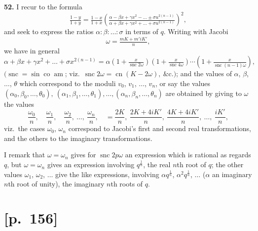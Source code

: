\documentclass[11pt]{article}
\begin{document}
\noindent\textbf{52.} I recur to the formula
\[
\tfrac{1-y}{1+y}=\tfrac{1-x}{1+x}\!\left(\tfrac{\alpha-\beta x+\gamma x^2-\ldots\pm\sigma u^{2(n-1)}}{\alpha+\beta x+\gamma x^2+\ldots+\sigma u^{2(n-1)}}\right)^{\!2}\!,
\]
and seek to express the ratios $\alpha:\beta:\ldots:\sigma$ in terms of $q$. Writing with Jacobi
\[
\omega=\tfrac{mK+m'iK'}{n},
\]
we have in general
\[
\alpha+\beta x+\gamma x^2+\ldots+\sigma x^{2(n-1)}=\alpha\!\left(1+\tfrac{x}{\operatorname{snc}2\omega}\right)\!\!\left(1+\tfrac{x}{\operatorname{snc}4\omega}\right)\!\cdots\!\left(1+\tfrac{x}{\operatorname{snc}(n-1)\omega}\right)\!,
\]
$(\operatorname{snc}=\operatorname{sin}\operatorname{co}\operatorname{am}$; viz.\ $\operatorname{snc}2\omega=\operatorname{cn}(K-2\omega),\ \&\text{c.})$;
and the values of $\alpha$, $\beta$, $\ldots$, $\theta$ which correspond to the moduli $v_0$, $v_1$, $\ldots$, $v_n$, or say the
values $(\alpha_0,\beta_0,\ldots,\theta_0),\ (\alpha_1,\beta_1,\ldots,\theta_1),\ldots,(\alpha_n,\beta_n,\ldots,\theta_n)$ are obtained by giving to $\omega$ the values
\[
\frac{\omega_0}{n},\quad \frac{\omega_1}{n},\quad \frac{\omega_2}{n},\ \ldots,\ \frac{\omega_n}{n},\quad =\frac{2K}{n},\ \frac{2K+4iK'}{n},\ \frac{4K+4iK'}{n},\ \ldots,\ \frac{iK'}{n},
\]
viz.\ the cases $\omega_0$, $\omega_n$ correspond to Jacobi's first and second real transformations, and
the others to the imaginary transformations.

I remark that $\omega=\omega_n$ gives for $\operatorname{snc}2p\omega$ an expression which is rational as regards
$q$, but $\omega=\omega_n$ gives an expression involving $q^{\frac{1}{n}}$, the real $n$th root of $q$; the other values
$\omega_1$, $\omega_2$, $\ldots$ give the like expressions, involving $\alpha q^{\frac{1}{n}}$, $\alpha^2 q^{\frac{1}{n}}$, $\ldots$ ($\alpha$ an imaginary $n$th root
of unity), the imaginary $n$th roots of $q$.

\section*{[p.~156]}
\end{document}
